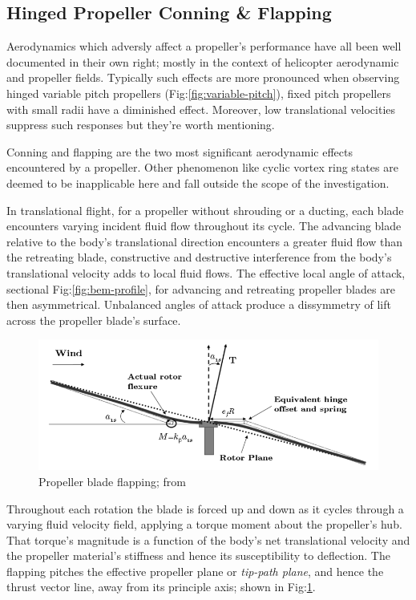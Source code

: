 \subsection{Hinged Propeller Conning \& Flapping}
\label{subsec:dynamics.aero.flap}
Aerodynamics which adversly affect a propeller's performance have all been well documented in their own right; mostly in the context of helicopter aerodynamic and propeller fields\cite{basichelicopter,bramwell}. Typically such effects are more pronounced when observing hinged variable pitch propellers (Fig:\ref{fig:variable-pitch}), fixed pitch propellers with small radii have a diminished effect. Moreover, low translational velocities suppress such responses but they're worth mentioning.
\par
Conning and flapping are the two most significant aerodynamic effects encountered by a propeller. Other phenomenon like cyclic vortex ring states are deemed to be inapplicable here and fall outside the scope of the investigation. 
\par
In translational flight, for a propeller without shrouding or a ducting, each blade encounters varying incident fluid flow throughout its cycle. The advancing blade relative to the body's translational direction encounters a greater fluid flow than the retreating blade, constructive and destructive interference from the body's translational velocity adds to local fluid flows. The effective local angle of attack, sectional Fig:\ref{fig:bem-profile}, for advancing and retreating propeller blades are then asymmetrical. Unbalanced angles of attack produce a dissymmetry of lift across the propeller blade's surface.
\par
\begin{figure}[htbp]
\centering
\includegraphics[width=\textwidth]{figs/prop-flap}
\caption{Propeller blade flapping; from \cite{starmac}}
\label{fig:prop-flap}
\end{figure}
\par
Throughout each rotation the blade is forced up and down as it cycles through a varying fluid velocity field, applying a torque moment about the propeller's hub. That torque's magnitude is a function of the body's net translational velocity and the propeller material's stiffness and hence its susceptibility to deflection. The flapping pitches the effective propeller plane or \emph{tip-path plane}, and hence the thrust vector line, away from its principle axis; shown in Fig:\ref{fig:prop-flap}.
